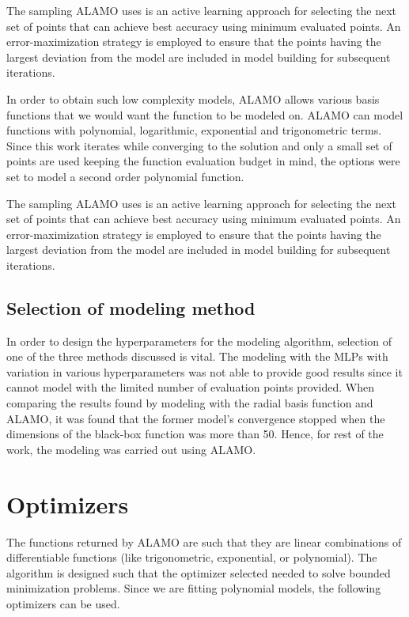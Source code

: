 \bigskip
\noindent
The sampling ALAMO uses is an active learning approach for selecting the next set of points that can achieve best accuracy using minimum evaluated points. An error-maximization strategy is employed to ensure that the points having the largest deviation from the model are included in model building for subsequent iterations. 

\bigskip
\noindent
In order to obtain such low complexity models, ALAMO allows various basis functions that we would want the function to be modeled on. ALAMO can model functions with polynomial, logarithmic, exponential and trigonometric terms. Since this work iterates while converging to the solution and only a small set of points are used keeping the function evaluation budget in mind, the options were set to model a second order polynomial function. 

\bigskip
\noindent
The sampling ALAMO uses is an active learning approach for selecting the next set of points that can achieve best accuracy using minimum evaluated points. An error-maximization strategy is employed to ensure that the points having the largest deviation from the model are included in model building for subsequent iterations. 

\subsection{Selection of modeling method}
In order to design the hyperparameters for the modeling algorithm, selection of one of the three methods discussed is vital. The modeling with the MLPs with variation in various hyperparameters was not able to provide good results since it cannot model with the limited number of evaluation points provided. When comparing the results found by modeling with the radial basis function and ALAMO, it was found that the former model's convergence stopped when the dimensions of the black-box function was more than 50. Hence, for rest of the work, the modeling was carried out using ALAMO.

\section{Optimizers}
The functions returned by ALAMO are such that they are linear combinations of differentiable functions (like trigonometric, exponential, or polynomial). The algorithm is designed such that the optimizer selected needed to solve bounded minimization problems. Since we are fitting polynomial models, the following optimizers can be used.

